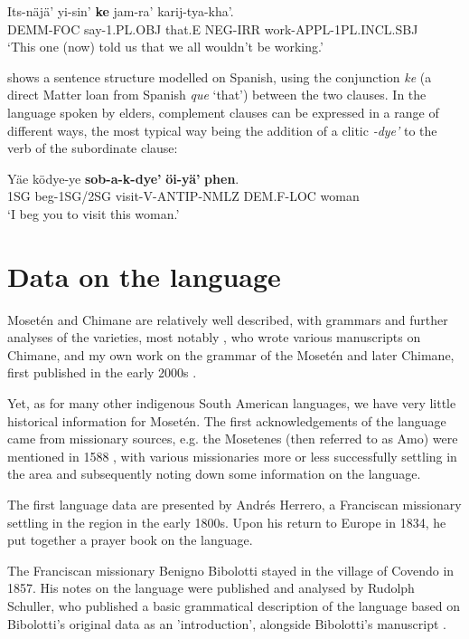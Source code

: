 \documentclass[output=paper,colorlinks,citecolor=brown
]{langscibook}
\begin{document}
\ea \label{sakel_example_4}
\gll Its-näjä’ 	yi-sin’ 		\textbf{ke} 	jam-ra’ 	karij-tya-kha’.\\
     DEM\textsc{M}-\textsc{FOC}  say-1\textsc{.PL.OBJ}    that.\textsc{E}  \textsc{NEG}-\textsc{IRR} work-\textsc{APPL-1PL.INCL.SBJ}\\
\glt ‘This one (now) told us that we all wouldn’t be working.’
\z

 shows a sentence structure modelled on Spanish, using the conjunction \textit{ke} (a direct Matter loan from Spanish \textit{que} ‘that’) between the two clauses. In the language spoken by elders, complement clauses can be expressed in a range of different ways, the most typical way being the addition of a clitic \textit{-dye’} to the verb of the subordinate clause:

\ea \label{sakel_example_5}
\gll Yäe  	ködye-ye  	\textbf{sob-a-k-dye’}  		\textbf{öi-yä’}  		\textbf{phen}.\\
     1\textsc{SG}	beg-\textsc{1SG/2SG}	visit-\textsc{V-ANTIP-NMLZ}	\textsc{DEM.F-LOC}	woman\\
\glt ‘I beg you to visit this woman.’
\z

\section{Data on the language}
Mosetén and Chimane are relatively well described, with grammars and further analyses of the varieties, most notably \citep{gill1999pedagogical}, who wrote various manuscripts on Chimane, and my own work on the grammar of the Mosetén and later Chimane, first published in the early 2000s \citep{sakel2004grammar}.

Yet, as for many other indigenous South American languages, we have very little historical information for Mosetén. The first acknowledgements of the language came from missionary sources, e.g. the Mosetenes (then referred to as Amo) were mentioned in 1588 \citep{metraux1942native}, with various missionaries more or less successfully settling in the area and subsequently noting down some information on the language. 

The first language data are presented by Andrés Herrero, a Franciscan missionary settling in the region in the early 1800s. Upon his return to Europe in 1834, he put together a prayer book on the language.

The Franciscan missionary Benigno Bibolotti stayed in the village of Covendo in 1857. His notes on the language were published and analysed by Rudolph Schuller, who published a basic grammatical description of the language based on Bibolotti’s original data as an 'introduction', alongside Bibolotti’s manuscript \citep{bibolotti1917moseteno, schuller1917introduction}. 
\end{document}
